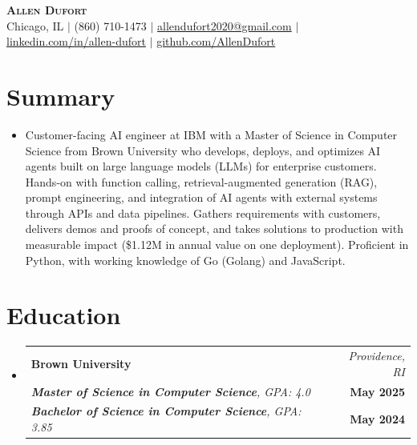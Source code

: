 \documentclass[letterpaper,10pt]{article}
\makeatletter
\newcommand{\resumeEdHeading}[6]{
  \item
  \begin{tabular*}{\textwidth}{l@{\extracolsep{\fill}}r}
    \textbf{#1} & \textit{\small #2} \\
    \textit{#3} & \textbf{\small #4} \\
    \textit{#5} & \textbf{\small #6} \\
  \end{tabular*}\vspace{-7pt}
}
\newcommand{\resumeSubHeadingListStart}{\begin{itemize}[leftmargin=0in, label={}]}
\newcommand{\resumeSubHeadingListEnd}{\end{itemize}}
\newcommand{\resumeItemListStart}{\begin{itemize}}
\newcommand{\resumeItemListEnd}{\end{itemize}\vspace{-5pt}}
\makeatother
\begin{document}
\begin{center}
  \textbf{\Huge \scshape Allen Dufort} \\ \vspace{6pt}
  \small
  Chicago, IL $|$
  (860) 710-1473 $|$
  \href{mailto:allendufort2020@gmail.com}{allendufort2020@gmail.com} $|$
  \href{https://www.linkedin.com/in/allen-dufort/}{linkedin.com/in/allen-dufort} $|$
  \href{https://github.com/AllenDufort}{github.com/AllenDufort}
\end{center}

\section{Summary}
\resumeItemListStart[leftmargin=0in, label={}]
  \item\small{
    Customer-facing AI engineer at IBM with a Master of Science in Computer Science from Brown University who develops, deploys, and optimizes AI agents built on large language models (LLMs) for enterprise customers. Hands-on with function calling, retrieval-augmented generation (RAG), prompt engineering, and integration of AI agents with external systems through APIs and data pipelines. Gathers requirements with customers, delivers demos and proofs of concept, and takes solutions to production with measurable impact (\$1.12M in annual value on one deployment). Proficient in Python, with working knowledge of Go (Golang) and JavaScript.
  }
\resumeItemListEnd

\section{Education}
\resumeSubHeadingListStart
  \resumeEdHeading
    {Brown University}{Providence, RI}
    {\textbf{Master of Science in Computer Science}, GPA: 4.0}{May 2025}
    {\textbf{Bachelor of Science in Computer Science}, GPA: 3.85}{May 2024}
\resumeSubHeadingListEnd

\end{document}

